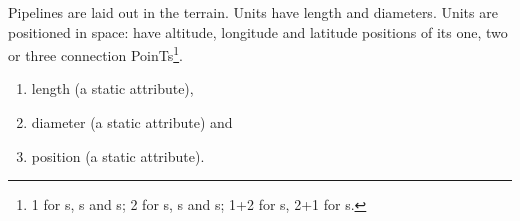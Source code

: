 
\label{wf-pls-metrics}
\begynd
\pind Pipelines are laid out in the terrain.
\begynd
\pind Units have length and diameters.
\pind Units are positioned in space: have altitude, longitude and
      latitude positions of its one, two or three
      connection PoinTs\footnote{1 for s, s and s; 2 for s,
      s and s; 1+2 for s, 2+1 for s.}. 
\afslut
\afslut

\begin{enumerate}\setei
\item \label{metrics-0000} length (a static attribute),
\item \label{metrics-0100} diameter (a static attribute) and
\item \label{metrics-0200} position (a static attribute).
\savei\end{enumerate}
\normalsize\mnewfoil\HHHH

